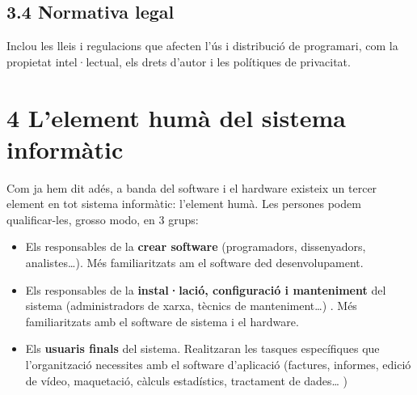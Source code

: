 \documentclass[
  12 pt,
  a4paper,
]{article}
\begin{document}
\subsection{3.4 Normativa legal}\label{normativa-legal}

Inclou les lleis i regulacions que afecten l'ús i distribució de
programari, com la propietat intel·lectual, els drets d'autor i les
polítiques de privacitat.

\section{4 L'element humà del sistema
informàtic}\label{lelement-humuxe0-del-sistema-informuxe0tic}

Com ja hem dit adés, a banda del software i el hardware existeix un
tercer element en tot sistema informàtic: l'element humà. Les persones
podem qualificar-les, grosso modo, en 3 grups:

\begin{itemize}
\item
  Els responsables de la \textbf{crear software} (programadors,
  dissenyadors, analistes\ldots). Més familiaritzats am el software ded
  desenvolupament.
\item
  Els responsables de la \textbf{instal·lació, configuració i
  manteniment} del sistema (administradors de xarxa, tècnics de
  manteniment\ldots) . Més familiaritzats amb el software de sistema i
  el hardware.
\item
  Els \textbf{usuaris finals} del sistema. Realitzaran les tasques
  específiques que l'organització necessites amb el software d'aplicació
  (factures, informes, edició de vídeo, maquetació, càlculs estadístics,
  tractament de dades\ldots{} )
\end{itemize}
\end{document}
